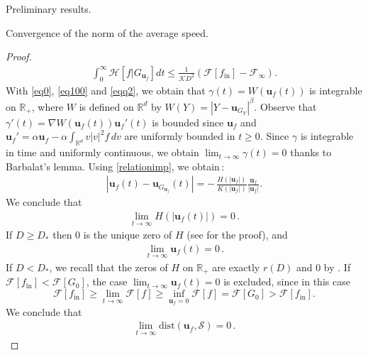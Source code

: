 \documentclass[reqno]{amsart} %
\begin{document}
\begin{section}{Preliminary results.}
\begin{subsection}{Convergence of the norm of the average speed.}
\begin{proof}
\begin{align}
\label{eqq2}
    \int_{0}^{\infty} \mathcal{H}[f|G_{\mathbf{u}_{f}}] dt \leq \frac{1}{\mathcal{K}D^2}( \mathcal{F}[f_{\mathrm{in}}]- \mathcal{F}_{\infty}).
\end{align}
With \eqref{eq0}, \eqref{eq100} and \eqref{eqq2}, we obtain that  $\gamma(t)= W(\mathbf{u}_{f}(t))$ is integrable on $\mathbb{R}_+$, where
$W$ is defined on $\mathbb{R}^d$ by \mbox{$W(Y)= |Y-\mathbf{u}_{G_Y}|^{\beta}$}. Observe that  $\gamma'(t)= \nabla W(\mathbf{u}_{f}(t))  \mathbf{u}_{f}'(t)$ is bounded since $\mathbf{u}_{f} $ and~\mbox{$\mathbf{u}_{f}'=\alpha \mathbf{u}_{f}-\alpha\int_{\mathbb{R}^d}v|v|^2f\,dv$}
are uniformly bounded in $t\geq0$. Since $\gamma$ is integrable in time and uniformly continuous, we obtain $\lim_{t\rightarrow \infty} \gamma(t)=0$ thanks to Barbalat's lemma. Using \eqref{relationimp}, we obtain\,: 
\begin{align*}
    |\mathbf{u}_{f}(t)-\mathbf{u}_{G_{\mathbf{u}_{f}}}(t)| = -\,\frac{{H}(|\mathbf{u}_{f}|)}{{K}(|\mathbf{u}_{f}|)} \frac{\mathbf{u}_{f}}{|\mathbf{u}_{f}|}.
\end{align*}
We conclude that 
\begin{align*}
    \lim_{t\rightarrow \infty}{H}(|\mathbf{u}_{f}(t)|) =0\,.
\end{align*}
If $D\geq D_*$ then 0 is the unique zero of $H$ (see \cite{Li2021} for the proof), and 
\begin{align*}
    \lim_{t \rightarrow{\infty}}\mathbf{u}_{f}(t)=0\,.
\end{align*}
If $D<D_*$, we recall that the zeros of ${H}$ on $\mathbb{R}_+$ are exactly $r(D)$ and $0$ by . If $\mathcal{F}[f_{\mathrm{in}}]<\mathcal{F}[G_0]$, the case $\lim_{t \rightarrow{\infty}}\mathbf{u}_{f}(t) =0$ is excluded, since in this case \[\mathcal{F}[f_{\mathrm{in}}]\geq \lim_{t\rightarrow \infty}\mathcal{F}[f]\geq \inf_{\mathbf{u}_{f}=0}\mathcal{F}[f]=\mathcal{F}[G_0]>\mathcal{F}[f_{\mathrm{in}}]. \]
We conclude that
\begin{equation*}
    \begin{aligned}
        \lim_{t \rightarrow{\infty}}\mathrm{dist}(\mathbf{u}_{f},\mathcal{S}) = 0\,. 
    \end{aligned}
\end{equation*}
\end{proof}
\end{subsection}
\end{section}
\end{document}

